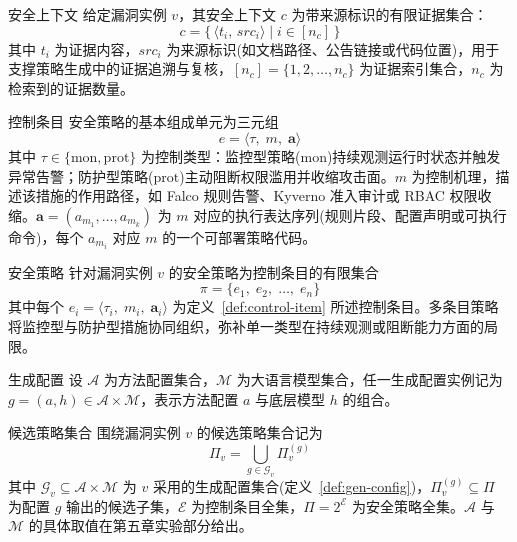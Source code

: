 \begin{flatdefinition}{安全上下文}\label{def:security-context}
给定漏洞实例 $v$，其安全上下文 $c$ 为带来源标识的有限证据集合：
\begin{equation}
c = \bigl\{\,\langle t_i,\,\mathit{src}_i \rangle \mid i\in[n_c] \,\bigr\}
\end{equation}
其中 $t_i$ 为证据内容，$\mathit{src}_i$ 为来源标识(如文档路径、公告链接或代码位置)，用于支撑策略生成中的证据追溯与复核，$[n_c]=\{1,2,\ldots,n_c\}$ 为证据索引集合，$n_c$ 为检索到的证据数量。
\end{flatdefinition}

\begin{flatdefinition}{控制条目}\label{def:control-item}
安全策略的基本组成单元为三元组
\begin{equation}
e = \langle \tau,\;m,\;\mathbf{a} \rangle
\end{equation}
其中 $\tau\in\{\mathrm{mon},\mathrm{prot}\}$ 为控制类型：监控型策略($\mathrm{mon}$)持续观测运行时状态并触发异常告警；防护型策略($\mathrm{prot}$)主动阻断权限滥用并收缩攻击面。$m$ 为控制机理，描述该措施的作用路径，如 Falco 规则告警、Kyverno 准入审计或 RBAC 权限收缩。$\mathbf{a}=(a_{m_1},\ldots,a_{m_k})$ 为 $m$ 对应的执行表达序列(规则片段、配置声明或可执行命令)，每个 $a_{m_i}$ 对应 $m$ 的一个可部署策略代码。
\end{flatdefinition}

\begin{flatdefinition}{安全策略}\label{def:security-strategy}
针对漏洞实例 $v$ 的安全策略为控制条目的有限集合
\begin{equation}
\pi = \{e_1,\;e_2,\;\ldots,\;e_n\}
\end{equation}
其中每个 $e_i=\langle \tau_i,\;m_i,\;\mathbf{a}_i\rangle$ 为定义~\ref{def:control-item} 所述控制条目。多条目策略将监控型与防护型措施协同组织，弥补单一类型在持续观测或阻断能力方面的局限。
\end{flatdefinition}

\begin{flatdefinition}{生成配置}\label{def:gen-config}
设 $\mathcal{A}$ 为方法配置集合，$\mathcal{M}$ 为大语言模型集合，任一生成配置实例记为 $g=(a,h)\in\mathcal{A}\times\mathcal{M}$，表示方法配置 $a$ 与底层模型 $h$ 的组合。
\end{flatdefinition}

\begin{flatdefinition}{候选策略集合}\label{def:candidate-strategy-set}
围绕漏洞实例 $v$ 的候选策略集合记为
\begin{equation}
\Pi_v=\bigcup_{g\in\mathcal{G}_v}\Pi_v^{(g)}
\end{equation}
其中 $\mathcal{G}_v\subseteq\mathcal{A}\times\mathcal{M}$ 为 $v$ 采用的生成配置集合(定义~\ref{def:gen-config})，$\Pi_v^{(g)}\subseteq\Pi$ 为配置 $g$ 输出的候选子集，$\mathcal{E}$ 为控制条目全集，$\Pi=2^{\mathcal{E}}$ 为安全策略全集。$\mathcal{A}$ 与 $\mathcal{M}$ 的具体取值在第五章实验部分给出。
\end{flatdefinition}


